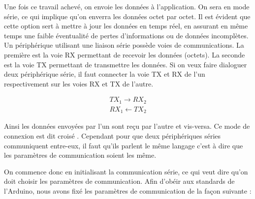 \documentclass{polytech/polytech}
\begin{document}

Une fois ce travail achevé, on envoie les données à l'application. On sera en mode série, ce qui implique qu'on enverra les données octet par octet. Il est évident que cette option sert à mettre à jour les données en temps réel, en assurant en même temps une faible éventualité de pertes d'informations ou de données incomplètes.
Un périphérique utilisant une liaison série possède voies de communications. La première est la voie RX permettant de recevoir les données (octets). La seconde est la voie TX permettant de transmettre les données.  Si on veux faire dialoguer deux périphérique série, il faut connecter la voie TX et RX de l'un respectivement sur les voies RX et TX de l'autre.

\begin{eqnarray}
TX_1 \rightarrow RX_2
\\
RX_1 \leftarrow TX_2
\end{eqnarray}

Ainsi les données envoyées par l'un sont reçu par l'autre et vis-versa. Ce mode de connexion est dit \guillemotleft croisé \guillemotright .
Cependant pour que deux périphériques séries communiquent entre-eux, il faut qu'ils parlent le même langage c'est à dire que les paramètres de communication soient les même.

On commence donc en initialisant la communication série, ce qui veut dire qu'on doit choisir les paramètres de communication. Afin d'obéir aux standards de l'Arduino, nous avons fixé les paramètres de communication de la façon suivante :
\end{document}
